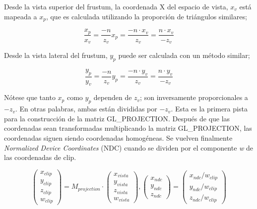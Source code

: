 Desde la vista superior del frustum, la coordenada X del espacio de vista, $x_v$ está mapeada a $x_p$, que es calculada utilizando la proporción de triángulos similares;
\begin{figure} [h]
  \centering
  \[
  \frac{x_p}{x_v} = \frac{-n}{z_v}
  x_p = \frac{-n \cdot x_v}{z_v} = \frac{n \cdot x_v}{-z_v}
  \]
\end{figure}

Desde la vista lateral del frustum, $y_p$ puede ser calculada con un método similar;

\begin{figure} [h]
  \centering
  \[ \frac{y_p}{y_v} = \frac{-n}{z_v}
  y_p = \frac{-n \cdot y_v}{z_v} = \frac{n \cdot y_v}{-z_v} \]
\end{figure}

\newpage
Nótese que tanto $x_p$ como $y_p$ dependen de $z_v$; son inversamente proporcionales a $-z_v$. En otras palabras, ambas están divididas por $-z_v$. Esta es la primera pista para la construcción de la matriz GL\_PROJECTION. Después de que las coordenadas sean transformadas multiplicando la matriz GL\_PROJECTION, las coordenadas siguen siendo coordenadas homogéneas. Se vuelven finalmente \textit{Normalized Device Coordinates} (NDC) cuando se dividen por el componente \textit{w} de las coordenadas de clip.

\begin{figure} [h]
  \centering
  \[
  \begin{pmatrix}
    x_{clip} \\ y_{clip} \\ z_{clip} \\ w_{clip}
  \end{pmatrix}
  =
  M_{projection} \cdot
  \begin{pmatrix}
    x_{vista} \\ y_{vista} \\ z_{vista} \\ w_{vista}
  \end{pmatrix} ,
  \begin{pmatrix}
    x_{ndc} \\ y_{ndc} \\ z_{ndc}
  \end{pmatrix}
  =
  \begin{pmatrix}
    x_{ndc}/w_{clip} \\ y_{ndc}/w_{clip} \\ z_{ndc}/w_{clip}
  \end{pmatrix}
  \]
\end{figure}


